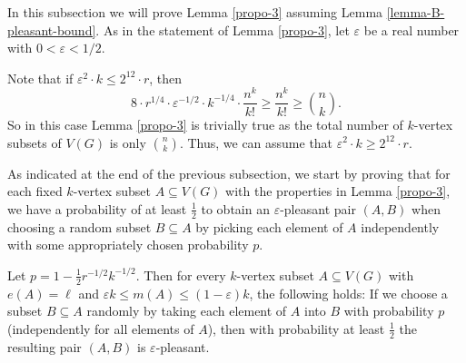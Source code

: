 In this subsection we will prove Lemma \ref{propo-3} assuming Lemma \ref{lemma-B-pleasant-bound}. As in the statement of Lemma \ref{propo-3}, let $\varepsilon$ be a real number with $0<\varepsilon<1/2$.

Note that if $\varepsilon^2\cdot k\leq 2^{12} \cdot r$, then
\[8\cdot r^{1/4}\cdot \varepsilon^{-1/2}\cdot k^{-1/4}\cdot \frac{n^k}{k!}\geq \frac{n^k}{k!}\geq {n \choose k}.\]
So in this case Lemma \ref{propo-3} is trivially true as the total number of $k$-vertex subsets of $V(G)$ is only ${n\choose k}$. Thus, we can assume that $\varepsilon^2\cdot k\geq 2^{12} \cdot r$.

As indicated at the end of the previous subsection, we start by proving that for each fixed $k$-vertex subset $A\subseteq V(G)$ with the properties in Lemma \ref{propo-3}, we have a probability of at least $\frac{1}{2}$ to obtain an $\varepsilon$-pleasant pair $(A,B)$ when choosing a random subset $B\subseteq A$ by picking each element of $A$ independently with some appropriately chosen probability $p$.

\begin{lemma}\label{lemma-A-3}Let $p=1-\frac{1}{2}r^{-1/2}k^{-1/2}$. Then for every $k$-vertex subset $A\subseteq V(G)$ with $e(A)=\ell$ and $\varepsilon k \leq m(A)\leq (1-\varepsilon) k$, the following holds: If we choose a subset $B\subseteq A$ randomly by taking each element of $A$ into $B$ with probability $p$ (independently for all elements of $A$), then with probability at least $\frac{1}{2}$ the resulting pair $(A,B)$ is $\varepsilon$-pleasant.
\end{lemma}

